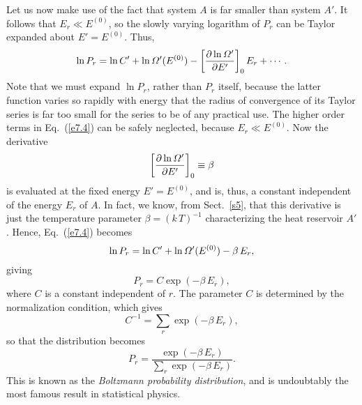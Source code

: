 Let us now make use of the fact that system $A$ is far smaller than system $A'$.
It follows that $E_r\ll E^{(0)}$, so the slowly varying logarithm of $P_r$
can be Taylor expanded about $E' = E^{(0)}$. Thus,
\begin{equation}
\ln P_r = \ln C' +\ln {\mit\Omega}'(E^{(0)}) -\left[\frac{\partial \ln {\mit\Omega}'}
{\partial E'} \right]_0 E_r +\cdots.\label{e7.4}
\end{equation}
Note that we must expand $\ln P_r$, rather than $P_r$ itself, because the latter
function varies so rapidly with energy
that the radius of convergence of its Taylor series
is far too small for the series to be of any practical use. 
 The higher order terms in Eq.~(\ref{e7.4}) can be safely
neglected, because $E_r \ll E^{(0)}$. Now the derivative
\begin{equation}
\left[\frac{\partial \ln {\mit\Omega}'}{\partial E'} \right]_0 \equiv \beta
\end{equation}
is evaluated at the fixed energy $E' = E^{(0)}$, and is, thus, a constant independent
of the energy $E_r$ of $A$. In fact, we know, from Sect.~\ref{s5}, that this derivative
 is just the
 temperature parameter $\beta = (k\,T)^{-1}$ characterizing the heat
reservoir $A'$. Hence, Eq.~(\ref{e7.4}) becomes
\begin{equation}
\ln P_r = \ln C' + \ln {\mit\Omega}'(E^{(0)}) - \beta\, E_r,
\end{equation}
giving
\begin{equation}
P_r = C \exp(-\beta \,E_r),
\end{equation}
where $C$ is a constant independent of $r$. The parameter $C$ is determined by 
the normalization condition, which gives
\begin{equation}
C^{-1} = \sum_r \exp(-\beta \,E_r),
\end{equation}
so that the distribution becomes
\begin{equation}
P_r = \frac{\exp(-\beta\, E_r)}{\sum_r \exp(-\beta \,E_r)}.
\end{equation}
This  is known as the {\em Boltzmann probability distribution}, and is undoubtably
the most famous result in statistical physics.

